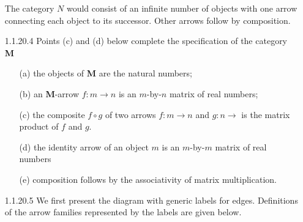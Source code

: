 \documentclass{article}
\begin{document}
\begin{enumerate}
  The category $N$ would consist of an infinite number of objects with one arrow connecting each object to its successor.
  Other arrows follow by composition.

\item[]
\item[1.1.20.4]
  Points (c) and (d) below complete the specification of the category \textbf{M}
  \begin{enumerate}
  \item [(a)]
    the objects of \textbf{M} are the natural numbers;
  \item [(b)]
    an \textbf{M}-arrow $f : m \rightarrow n$ is an $m$-by-$n$ matrix of real numbers;
  \item [(c)]
    the composite $f \circ g$ of two arrows $f : m \rightarrow n$ and $g : n \rightarrow $ is the matrix product of $f$ and $g$.
  \item [(d)]
    the identity arrow of an object $m$ is an $m$-by-$m$ matrix of real numbers
  \item [(e)]
    composition follows by the associativity of matrix multiplication.
  \end{enumerate}

\item[]
\item[1.1.20.5]
  We first present the diagram with generic labels for edges.
  Definitions of the arrow families represented by the labels are given below.

  \begin{center}
\end{center}
\end{enumerate}
\end{document}
